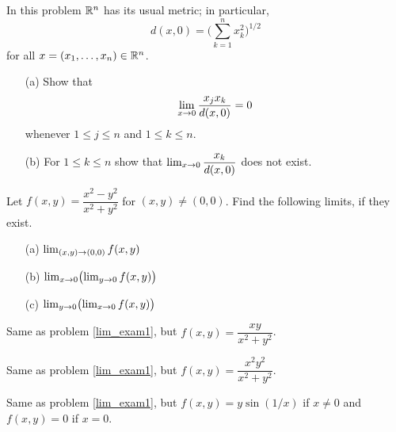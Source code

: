 \begin{prob}\label{prob_lim_Rn} In this problem $\mathbb{R}^n$ has its usual metric; in particular,
   \[ d(x,0) = \biggl(\sum_{k=1}^n x_k^2\biggr)^{1/2} \]
for all $x = (x_1,\dots,x_n) \in \mathbb{R}^n$.
 \begin{enumerate}
  \item[(a)] Show that
   \[ \lim_{x \rightarrow 0} \frac{x_jx_k}{d(x,0)} = 0 \]
whenever $1 \le j \le n$ and $1 \le k \le n$.
  \item[(b)] For $1 \le k \le n$ show that $\lim_{x \rightarrow 0}\dfrac{x_k}{d(x,0)}$ does not exist.
 \end{enumerate}
\end{prob}

\begin{prob}\label{lim_exam1} Let $f(x,y) = \dfrac{x^2 - y^2}{x^2 + y^2}$ for $(x,y) \ne (0,0)$.
Find the following limits, if they exist.
 \begin{enumerate}
  \item[(a)] $\lim_{(x,y) \rightarrow (0,0)}f(x,y)$
  \item[(b)] $\lim_{x \rightarrow 0}\bigl(\lim_{y \rightarrow 0}f(x,y)\bigr)$
  \item[(c)] $\lim_{y \rightarrow 0}\bigl(\lim_{x \rightarrow 0}f(x,y)\bigr)$
 \end{enumerate}
\end{prob}

\begin{prob} Same as problem \ref{lim_exam1}, but $f(x,y) = \dfrac{xy}{x^2 + y^2}$.
\end{prob}

\begin{prob} Same as problem \ref{lim_exam1}, but $f(x,y) = \dfrac{x^2y^2}{x^2 + y^2}$.
\end{prob}

\begin{prob} Same as problem \ref{lim_exam1}, but $f(x,y) = y\sin(1/x)$ if $x \ne 0$ and
$f(x,y) = 0$ if $x = 0$.
\end{prob}




\endinput
